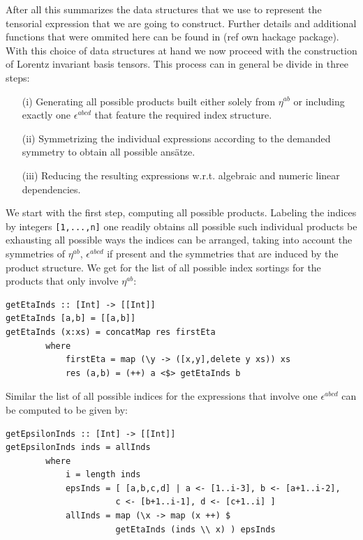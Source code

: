 \documentclass[a4paper,12pt, DIV=14, BCOR=5mm, twoside, headsepline]{scrbook}
\begin{document}
After all this summarizes the data structures that we use to represent the tensorial expression that we are going to construct. Further details and additional functions that were ommited here can be found in (ref own hackage package).  \\

With this choice of data structures at hand we now proceed with the construction of Lorentz invariant basis tensors.  
This process can in general be divide in three steps:
\begin{itemize}
    \item[(i)] Generating all possible products built either solely from $\eta^{ab}$ or including exactly one $\epsilon^{abcd}$ that feature the required index structure.
    \item[(ii)] Symmetrizing the individual expressions according to the demanded symmetry to obtain all possible ansätze.
    \item[(iii)] Reducing the resulting expressions w.r.t. algebraic and numeric linear dependencies.
\end{itemize}
We start with the first step, computing all possible products. Labeling the indices by integers \texttt{[1,...,n]} one readily obtains all possible such individual products be exhausting all possible ways the indices can be arranged, taking into account the symmetries of $\eta^{ab}$, $\epsilon^{abcd}$ if present and the symmetries that are induced by the product structure. We get for the list of all possible index sortings for the products that only involve $\eta^{ab}$:

\begin{samepage}
\begin{verbatim}
getEtaInds :: [Int] -> [[Int]]
getEtaInds [a,b] = [[a,b]]
getEtaInds (x:xs) = concatMap res firstEta
        where
            firstEta = map (\y -> ([x,y],delete y xs)) xs
            res (a,b) = (++) a <$> getEtaInds b 
\end{verbatim} 
\end{samepage}

Similar the list of all possible indices for the expressions that involve one $\epsilon^{abcd}$ can be computed to be given by:

\begin{samepage}
\begin{verbatim}
getEpsilonInds :: [Int] -> [[Int]]
getEpsilonInds inds = allInds
        where
            i = length inds 
            epsInds = [ [a,b,c,d] | a <- [1..i-3], b <- [a+1..i-2],
                      c <- [b+1..i-1], d <- [c+1..i] ] 
            allInds = map (\x -> map (x ++) $
                      getEtaInds (inds \\ x) ) epsInds 
\end{verbatim} 
\end{samepage}
\end{document}
